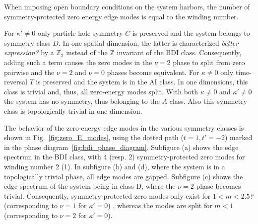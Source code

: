 \documentclass[twocolumn,amsmath,longbibliography,amssymb,superscriptaddress]{revtex4-1}
\newcommand{\mariac}[1]{{\it\color{cyan}#1}}
\begin{document}
When imposing open boundary conditions on the system harbors, the number of symmetry-protected zero energy edge modes is equal to the winding number. 

For $\kappa' \neq 0$ only particle-hole symmetry $C$ is preserved and the system belongs to symmetry class $D$. 
In one spatial dimension, the latter is characterized \mariac{better expression?} by a $\mathbb{Z}_2$ instead of the $\mathbb{Z}$ invariant of the BDI class. 
Consequently, adding such a term causes the zero modes in the $\nu=2$ phase to split from zero pairwise and the $\nu = 2$ and $\nu=0$ phases become equivalent. 
For $\kappa \neq 0$ only time-reversal $T$ is preserved and the system is in the AI class. 
In one dimensions, this class is trivial and, thus,  all zero-energy modes split. 
With both $\kappa \neq 0$ and $\kappa' \neq0$ the system has no symmetry, thus belonging to the $A$ class.  Also this symmetry class is topologically trivial in one dimension. 

The behavior of the zero-energy edge modes in the various symmetry classes is  shown in Fig.~\ref{fig:zero_E_modes}, using the dotted path ($t=1,t'=-2$) marked in the phase diagram~\ref{fig:bdi_phase_diagram}. 
Subfigure (a) shows the edge spectrum in the BDI class, with 4 (resp. 2) symmetry-protected zero modes for winding number 2 (1). 
In subfigure (b) and (d), where the system is in a topologically trivial phase, all edge modes are gapped. 
Subfigure (c) shows the edge spectrum of the system being in class D, where the $\nu=2 $ phase becomes trivial. 
Consequently, symmetry-protected zero modes only exist for $1<m<2.5$\mariac{?} (corresponding to $\nu=1$ for $\kappa'=0$) , whereas the modes are split for $m<1$ (corresponding to $\nu=2$ for $\kappa'=0$).
\end{document}

